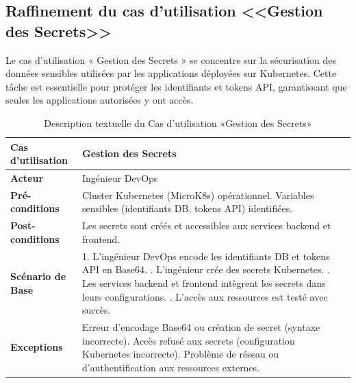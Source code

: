   \subsection{Raffinement du cas d'utilisation <<Gestion des Secrets>>}
  Le cas d’utilisation « Gestion des Secrets » se concentre sur la sécurisation des données sensibles utilisées par les applications déployées sur Kubernetes. Cette tâche est essentielle pour protéger les identifiants et tokens API, garantissant que seules les applications autorisées y ont accès.
  \begin{table}[!ht]
      \centering
      \caption{Description textuelle du Cas d’utilisation «Gestion des Secrets»}
      \label{tab:gestion_secrets}
      \renewcommand{\arraystretch}{1.2}
      \begin{tabular}{|p{4.2cm}|p{11cm}|}
      \hline
      \textbf{Cas d'utilisation} & Gestion des Secrets \\
      \hline
      \textbf{Acteur} & Ingénieur DevOps \\
      \hline
      \textbf{Pré-conditions} & Cluster Kubernetes (MicroK8s) opérationnel. \newline Variables sensibles (identifiants DB, tokens API) identifiées. \\
      \hline
      \textbf{Post-conditions} & Les secrets sont créés et accessibles aux services backend et frontend. \\
      \hline
      \textbf{Scénario de Base} & 
      1. L’ingénieur DevOps encode les identifiants DB et tokens API en Base64. \newline
      2. L’ingénieur crée des secrets Kubernetes. \newline
      3. Les services backend et frontend intègrent les secrets dans leurs configurations. \newline
      4. L’accès aux ressources est testé avec succès. \\
      \hline
      \textbf{Exceptions} & 
      Erreur d’encodage Base64 ou création de secret (syntaxe incorrecte). \newline Accès refusé aux secrets (configuration Kubernetes incorrecte). \newline Problème de réseau ou d’authentification aux ressources externes. \\
      \hline
      \end{tabular}
  \end{table}
  \newpage
